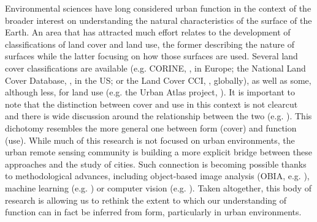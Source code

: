 Environmental sciences have long considered urban function
in the context of the broader interest on understanding the natural
characteristics of the surface of the Earth.
An area that has attracted much effort relates to the development of
classifications of land cover and land use, the former describing the nature of
surfaces while the latter focusing on how those surfaces are used. Several
land cover classifications are available (e.g. CORINE,
        \citealp{europeanenvironmentagency1990}, in Europe;
the National Land Cover Database, \citealp{homer2012national}, in the US; or
the Land Cover CCI, \citealp{defourny2012land}, globally), as well as some,
although less, for land use (e.g. the Urban Atlas project, \citealp{urban_atlas}).
%
It is important to note that the distinction between cover and use in this
context is not clearcut and there is wide discussion around the relationship
between the two
(e.g. \citealp{fisher2005land, doi:10.1080/17474230802434187}).
This dichotomy resembles the more general one between form (cover) and
function (use).
While much of this research is not focused on urban environments, the urban
remote sensing community \citep{weng2018urban} is building a more explicit
bridge between these approaches and the study of cities. Such connection is
becoming possible thanks to methodological advances, including object-based image
analysis (OBIA, e.g. \citealp{prasad2015remotely}), machine
learning (e.g. \citealp{kuffer2016slums, georganos2018very, JOCHEM2018104})
or computer vision (e.g. \citealp{stark2020satellite}).
Taken altogether, this body of research is allowing us to rethink the extent
to which our understanding of function can in fact be inferred from form,
particularly in urban environments.

